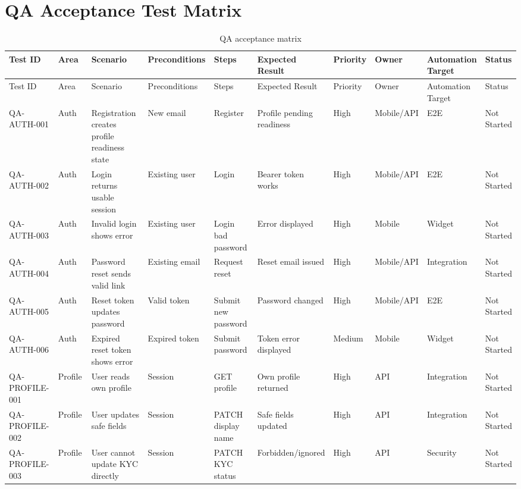 \chapter*{QA Acceptance Test Matrix}

\begin{longtable}{p{0.12\linewidth}p{0.1\linewidth}p{0.22\linewidth}p{0.14\linewidth}p{0.14\linewidth}p{0.14\linewidth}p{0.07\linewidth}p{0.08\linewidth}p{0.1\linewidth}p{0.08\linewidth}}
\caption{QA acceptance matrix}\\
\toprule
Test ID & Area & Scenario & Preconditions & Steps & Expected Result & Priority & Owner & Automation Target & Status \\
\midrule
\endfirsthead
\toprule
Test ID & Area & Scenario & Preconditions & Steps & Expected Result & Priority & Owner & Automation Target & Status \\
\midrule
\endhead
QA-AUTH-001 & Auth & Registration creates profile readiness state & New email & Register & Profile pending readiness & High & Mobile/API & E2E & Not Started \\
QA-AUTH-002 & Auth & Login returns usable session & Existing user & Login & Bearer token works & High & Mobile/API & E2E & Not Started \\
QA-AUTH-003 & Auth & Invalid login shows error & Existing user & Login bad password & Error displayed & High & Mobile & Widget & Not Started \\
QA-AUTH-004 & Auth & Password reset sends valid link & Existing email & Request reset & Reset email issued & High & Mobile/API & Integration & Not Started \\
QA-AUTH-005 & Auth & Reset token updates password & Valid token & Submit new password & Password changed & High & Mobile/API & E2E & Not Started \\
QA-AUTH-006 & Auth & Expired reset token shows error & Expired token & Submit password & Token error displayed & Medium & Mobile & Widget & Not Started \\
QA-PROFILE-001 & Profile & User reads own profile & Session & GET profile & Own profile returned & High & API & Integration & Not Started \\
QA-PROFILE-002 & Profile & User updates safe fields & Session & PATCH display name & Safe fields updated & High & API & Integration & Not Started \\
QA-PROFILE-003 & Profile & User cannot update KYC directly & Session & PATCH KYC status & Forbidden/ignored & High & API & Security & Not Started \\

\end{longtable}
